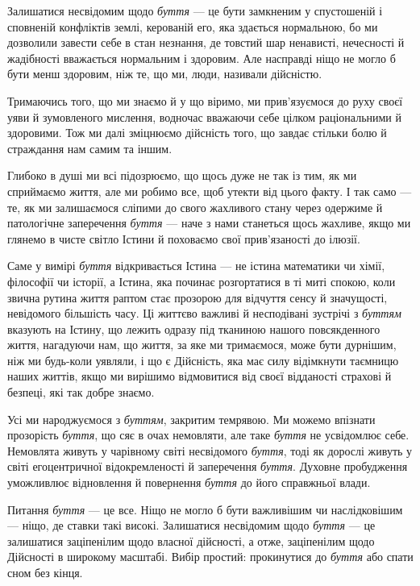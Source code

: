 Залишатися несвідомим щодо \emph{буття} — це бути замкненим у спустошеній і сповненій конфліктів землі, керованій его, яка здається нормальною, бо ми дозволили завести себе в стан незнання, де товстий шар ненависті, нечесності й жадібності вважається нормальним і здоровим. Але насправді ніщо не могло б бути менш здоровим, ніж те, що ми, люди, називали дійсністю.

Тримаючись того, що ми знаємо й у що віримо, ми прив'язуємося до руху своєї уяви й зумовленого мислення, водночас вважаючи себе цілком раціональними й здоровими. Тож ми далі зміцнюємо дійсність того, що завдає стільки болю й страждання нам самим та іншим.

Глибоко в душі ми всі підозрюємо, що щось дуже не так із тим, як ми сприймаємо життя, але ми робимо все, щоб утекти від цього факту. І так само — те, як ми залишаємося сліпими до свого жахливого стану через одержиме й патологічне заперечення \emph{буття} — наче з нами станеться щось жахливе, якщо ми глянемо в чисте світло Істини й поховаємо свої прив'язаності до ілюзії.

Саме у вимірі \emph{буття} відкривається Істина — не істина математики чи хімії, філософії чи історії, а Істина, яка починає розгортатися в ті миті спокою, коли звична рутина життя раптом стає прозорою для відчуття сенсу й значущості, невідомого більшість часу. Ці життєво важливі й несподівані зустрічі з \emph{буттям} вказують на Істину, що лежить одразу під тканиною нашого повсякденного життя, нагадуючи нам, що життя, за яке ми тримаємося, може бути дурнішим, ніж ми будь-коли уявляли, і що є Дійсність, яка має силу відімкнути таємницю наших життів, якщо ми вирішимо відмовитися від своєї відданості страхові й безпеці, які так добре знаємо.

Усі ми народжуємося з \emph{буттям}, закритим темрявою. Ми можемо впізнати прозорість \emph{буття}, що сяє в очах немовляти, але таке \emph{буття} не усвідомлює себе. Немовлята живуть у чарівному світі несвідомого \emph{буття}, тоді як дорослі живуть у світі егоцентричної відокремленості й заперечення \emph{буття}. Духовне пробудження уможливлює відновлення й повернення \emph{буття} до його справжньої влади.

Питання \emph{буття} — це все. Ніщо не могло б бути важливішим чи наслідковішим — ніщо, де ставки такі високі. Залишатися несвідомим щодо \emph{буття} — це залишатися заціпенілим щодо власної дійсності, а отже, заціпенілим щодо Дійсності в широкому масштабі. Вибір простий: прокинутися до \emph{буття} або спати сном без кінця.
